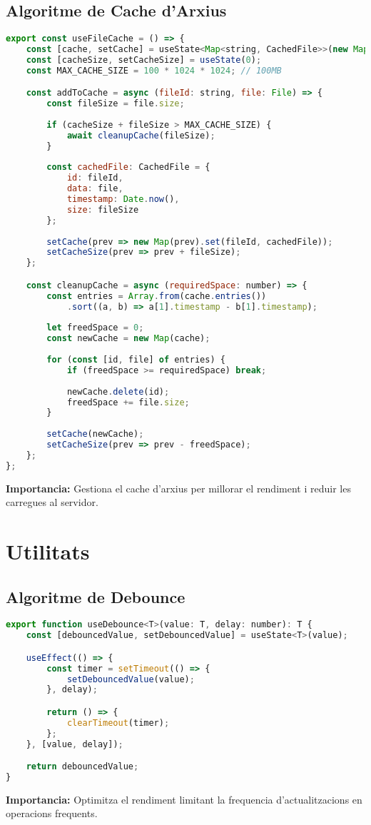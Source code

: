 \subsection{Algoritme de Cache d'Arxius}
\begin{lstlisting}[language=JavaScript]
export const useFileCache = () => {
    const [cache, setCache] = useState<Map<string, CachedFile>>(new Map());
    const [cacheSize, setCacheSize] = useState(0);
    const MAX_CACHE_SIZE = 100 * 1024 * 1024; // 100MB

    const addToCache = async (fileId: string, file: File) => {
        const fileSize = file.size;
        
        if (cacheSize + fileSize > MAX_CACHE_SIZE) {
            await cleanupCache(fileSize);
        }
        
        const cachedFile: CachedFile = {
            id: fileId,
            data: file,
            timestamp: Date.now(),
            size: fileSize
        };
        
        setCache(prev => new Map(prev).set(fileId, cachedFile));
        setCacheSize(prev => prev + fileSize);
    };

    const cleanupCache = async (requiredSpace: number) => {
        const entries = Array.from(cache.entries())
            .sort((a, b) => a[1].timestamp - b[1].timestamp);
            
        let freedSpace = 0;
        const newCache = new Map(cache);
        
        for (const [id, file] of entries) {
            if (freedSpace >= requiredSpace) break;
            
            newCache.delete(id);
            freedSpace += file.size;
        }
        
        setCache(newCache);
        setCacheSize(prev => prev - freedSpace);
    };
};
\end{lstlisting}
\textbf{Importancia:} Gestiona el cache d'arxius per millorar el rendiment i reduir les carregues al servidor.

\section{Utilitats}

\subsection{Algoritme de Debounce}
\begin{lstlisting}[language=JavaScript]
export function useDebounce<T>(value: T, delay: number): T {
    const [debouncedValue, setDebouncedValue] = useState<T>(value);

    useEffect(() => {
        const timer = setTimeout(() => {
            setDebouncedValue(value);
        }, delay);

        return () => {
            clearTimeout(timer);
        };
    }, [value, delay]);

    return debouncedValue;
}
\end{lstlisting}
\textbf{Importancia:} Optimitza el rendiment limitant la frequencia d'actualitzacions en operacions frequents.

